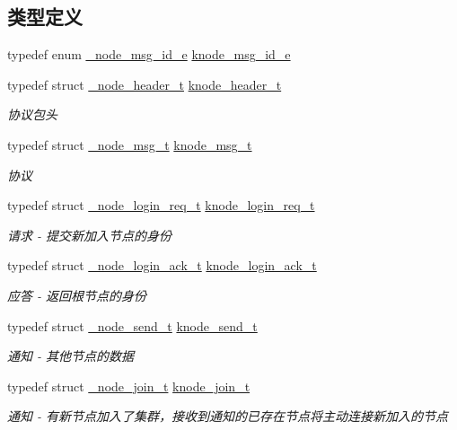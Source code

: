 \subsection*{类型定义}
\begin{DoxyCompactItemize}
\item 
typedef enum \hyperlink{a00101_a9e9638fcf1028148cae57ff95be55244_a9e9638fcf1028148cae57ff95be55244}{\+\_\+node\+\_\+msg\+\_\+id\+\_\+e} \hyperlink{a00101_ae07741c75a46c112cfe323cbe86dd330_ae07741c75a46c112cfe323cbe86dd330}{knode\+\_\+msg\+\_\+id\+\_\+e}
\item 
typedef struct \hyperlink{a00035}{\+\_\+node\+\_\+header\+\_\+t} \hyperlink{a00101_a8624d982efa4afd872ffe22695031845_a8624d982efa4afd872ffe22695031845}{knode\+\_\+header\+\_\+t}
\begin{DoxyCompactList}\small\item\em 协议包头 \end{DoxyCompactList}\item 
typedef struct \hyperlink{a00039}{\+\_\+node\+\_\+msg\+\_\+t} \hyperlink{a00101_a55350f9eeac5f171e5a08304f733ac48_a55350f9eeac5f171e5a08304f733ac48}{knode\+\_\+msg\+\_\+t}
\begin{DoxyCompactList}\small\item\em 协议 \end{DoxyCompactList}\item 
typedef struct \hyperlink{a00038}{\+\_\+node\+\_\+login\+\_\+req\+\_\+t} \hyperlink{a00101_aaa9a7ac2f4b54f05d920eb26f6a2743b_aaa9a7ac2f4b54f05d920eb26f6a2743b}{knode\+\_\+login\+\_\+req\+\_\+t}
\begin{DoxyCompactList}\small\item\em 请求 -\/ 提交新加入节点的身份 \end{DoxyCompactList}\item 
typedef struct \hyperlink{a00037}{\+\_\+node\+\_\+login\+\_\+ack\+\_\+t} \hyperlink{a00101_a22a0f0b9dd70f9ffcaa7488e06b3ffca_a22a0f0b9dd70f9ffcaa7488e06b3ffca}{knode\+\_\+login\+\_\+ack\+\_\+t}
\begin{DoxyCompactList}\small\item\em 应答 -\/ 返回根节点的身份 \end{DoxyCompactList}\item 
typedef struct \hyperlink{a00041}{\+\_\+node\+\_\+send\+\_\+t} \hyperlink{a00101_a7fd7cc48c0ea89738e6bd1bb8091f9d3_a7fd7cc48c0ea89738e6bd1bb8091f9d3}{knode\+\_\+send\+\_\+t}
\begin{DoxyCompactList}\small\item\em 通知 -\/ 其他节点的数据 \end{DoxyCompactList}\item 
typedef struct \hyperlink{a00036}{\+\_\+node\+\_\+join\+\_\+t} \hyperlink{a00101_af3703e322cb7baa966d39c30d84e76c5_af3703e322cb7baa966d39c30d84e76c5}{knode\+\_\+join\+\_\+t}
\begin{DoxyCompactList}\small\item\em 通知 -\/ 有新节点加入了集群，接收到通知的已存在节点将主动连接新加入的节点 \end{DoxyCompactList}\end{DoxyCompactItemize}
